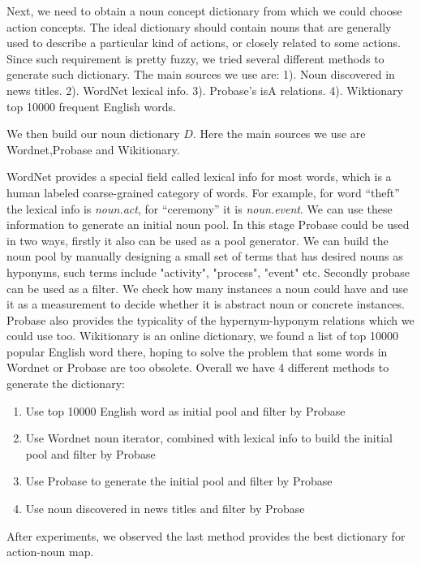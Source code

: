 Next, we need to obtain a noun concept dictionary from which we could choose action concepts. The ideal dictionary should contain
nouns that are generally used to describe a particular kind of actions, or closely related to some actions. Since such requirement
is pretty fuzzy, we tried several different methods to generate such dictionary. The main sources we use are: 1). Noun discovered
in news titles. 2). WordNet lexical info. 3). Probase's isA relations. 4). Wiktionary top 10000 frequent English words.

We then build our noun dictionary $D$. Here the main sources we use are Wordnet,Probase and Wikitionary.

WordNet provides a special field called lexical info for most words, which is a human labeled coarse-grained category of words.
For example, for word ``theft'' the lexical info is \emph{noun.act}, for ``ceremony'' it is \emph{noun.event}.
We can use these information to generate an initial noun pool. In this stage Probase could be used in two ways, firstly it
also can be used as a pool generator. We can build the noun pool by manually designing
a small set of terms that has desired nouns as hyponyms, such terms include "activity",
"process", "event" etc. Secondly probase can be used as a filter. We check how
many instances a noun could have and use it as a measurement to decide whether it
is abstract noun or concrete instances. Probase also provides the typicality of
the hypernym-hyponym relations which we could use too. Wikitionary is an online
dictionary, we found a list of top 10000 popular English word there, hoping to
solve the problem that some words in Wordnet or Probase are too obsolete.
Overall we have 4 different methods to generate the dictionary:
\begin{enumerate}
\item Use top 10000 English word as initial pool and filter by Probase
\item Use Wordnet noun iterator, combined with lexical info to build the initial pool and filter by Probase
\item Use Probase to generate the initial pool and filter by Probase
\item Use noun discovered in news titles and filter by Probase
\end{enumerate}

After experiments, we observed the last method provides the best dictionary for action-noun map.
